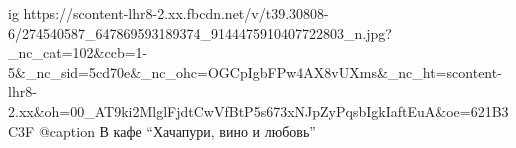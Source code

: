  
 
 
 
 

\ifcmt
  ig https://scontent-lhr8-2.xx.fbcdn.net/v/t39.30808-6/274540587_647869593189374_9144475910407722803_n.jpg?_nc_cat=102&ccb=1-5&_nc_sid=5cd70e&_nc_ohc=OGCpIgbFPw4AX8vUXms&_nc_ht=scontent-lhr8-2.xx&oh=00_AT9ki2MlglFjdtCwVfBtP5s673xNJpZyPqsbIgkIaftEuA&oe=621B3C3F
	@caption В кафе \enquote{Хачапури, вино и любовь}
\fi
